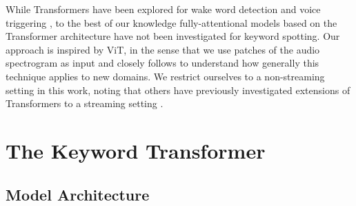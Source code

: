 \documentclass[a4paper]{article}
\begin{document}
While Transformers have been explored for wake word detection \cite{wang2021wake} and voice triggering \cite{adya2020hybrid}, to the best of our knowledge fully-attentional models based on the Transformer architecture have not been investigated for keyword spotting. Our approach is inspired by ViT, in the sense that we use patches of the audio spectrogram as input and closely follows \cite{touvron2020training} to understand how generally this technique applies to new domains. We restrict ourselves to a non-streaming setting in this work, noting that others have previously investigated extensions of Transformers to a streaming setting \cite{wang2021wake, chenwu2020streaming}.

\section{The Keyword Transformer}

\subsection{Model Architecture}
\end{document}
